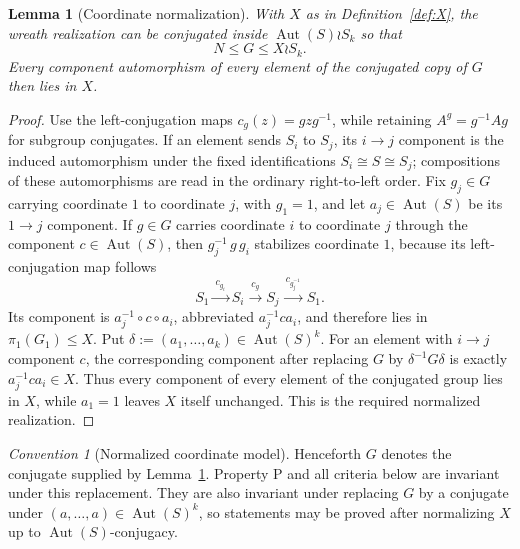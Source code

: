 \documentclass[11pt]{amsart}
\newtheorem{lemma}[theorem]{Lemma}
\theoremstyle{definition}
\theoremstyle{remark}
\newtheorem{convention}[theorem]{Convention}
\DeclareMathOperator{\Aut}{Aut}
\begin{document}
\begin{lemma}[Coordinate normalization]\label{lem:coordinate-normalization}
With $X$ as in Definition~\ref{def:X}, the wreath realization can be
conjugated inside $\Aut(S)\wr S_k$ so that
\[
 N\leq G\leq X\wr S_k.
\]
Every component automorphism of every element of the conjugated copy of $G$
then lies in $X$.
\end{lemma}

\begin{proof}
Use the left-conjugation maps $c_g(z)=gzg^{-1}$, while retaining
$A^g=g^{-1}Ag$ for subgroup conjugates. If an element sends $S_i$ to $S_j$,
its $i\!\to\!j$ component is the induced automorphism under the fixed
identifications $S_i\cong S\cong S_j$; compositions of these automorphisms
are read in the ordinary right-to-left order. Fix $g_j\in G$ carrying
coordinate $1$ to coordinate $j$, with $g_1=1$, and let $a_j\in\Aut(S)$ be
its $1\!\to\!j$ component. If $g\in G$ carries coordinate $i$ to coordinate
$j$ through the component $c\in\Aut(S)$, then $g_j^{-1}\,g\,g_i$ stabilizes
coordinate $1$, because its left-conjugation map follows
\[
 S_1\xrightarrow{\ c_{g_i}\ }S_i
 \xrightarrow{\ c_g\ }S_j
 \xrightarrow{\ c_{g_j^{-1}}\ }S_1.
\]
Its component is $a_j^{-1}\circ c\circ a_i$, abbreviated
$a_j^{-1}ca_i$, and therefore lies in $\pi_1(G_1)\leq X$. Put
$\delta:=(a_1,\dots,a_k)\in\Aut(S)^k$. For an element with
$i\!\to\!j$ component $c$, the corresponding component after replacing
$G$ by $\delta^{-1}G\delta$ is exactly $a_j^{-1}ca_i\in X$. Thus every
component of every element of the conjugated group lies in $X$, while
$a_1=1$ leaves $X$ itself unchanged. This is the required normalized
realization.
\end{proof}

\begin{convention}[Normalized coordinate model]\label{conv:X}
Henceforth $G$ denotes the conjugate supplied by
Lemma~\ref{lem:coordinate-normalization}. Property $\mathrm{P}$ and all
criteria below are invariant under this replacement. They are also invariant
under replacing $G$ by a conjugate under
$(a,\dots,a)\in\Aut(S)^k$, so statements may be proved after normalizing
$X$ up to $\Aut(S)$-conjugacy.
\end{convention}
\end{document}
